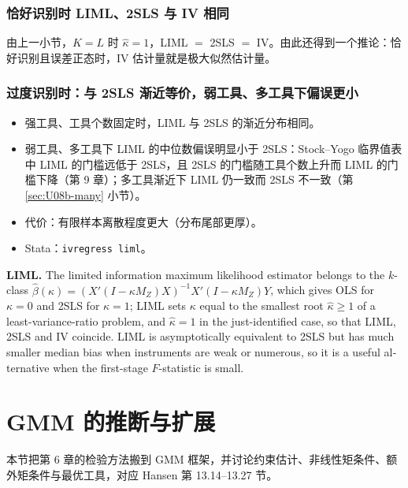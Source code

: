 \subsubsection{恰好识别时 LIML、2SLS 与 IV 相同}

由上一小节，$K=L$ 时 $\hat\kappa=1$，LIML $=$ 2SLS $=$ IV。由此还得到一个推论：恰好识别且误差正态时，IV 估计量就是极大似然估计量。

\subsubsection{过度识别时：与 2SLS 渐近等价，弱工具、多工具下偏误更小}

\begin{itemize}
  \item 强工具、工具个数固定时，LIML 与 2SLS 的渐近分布相同。
  \item 弱工具、多工具下 LIML 的中位数偏误明显小于 2SLS：Stock--Yogo 临界值表中 LIML 的门槛远低于 2SLS，且 2SLS 的门槛随工具个数上升而 LIML 的门槛下降（第 9 章）；多工具渐近下 LIML 仍一致而 2SLS 不一致（第 \ref{sec:U08b-many} 小节）。
  \item 代价：有限样本离散程度更大（分布尾部更厚）。
  \item Stata：\texttt{ivregress liml}。
\end{itemize}

\begin{english}
\textbf{LIML.} The limited information maximum likelihood estimator belongs to the $k$-class $\hat\beta(\kappa)=(X'(I-\kappa M_Z)X)^{-1}X'(I-\kappa M_Z)Y$, which gives OLS for $\kappa=0$ and 2SLS for $\kappa=1$; LIML sets $\kappa$ equal to the smallest root $\hat\kappa\ge1$ of a least-variance-ratio problem, and $\hat\kappa=1$ in the just-identified case, so that LIML, 2SLS and IV coincide. LIML is asymptotically equivalent to 2SLS but has much smaller median bias when instruments are weak or numerous, so it is a useful alternative when the first-stage $F$-statistic is small.
\end{english}

\section{GMM 的推断与扩展}\label{sec:U08b-infer}

本节把第 6 章的检验方法搬到 GMM 框架，并讨论约束估计、非线性矩条件、额外矩条件与最优工具，对应 Hansen 第 13.14--13.27 节。

